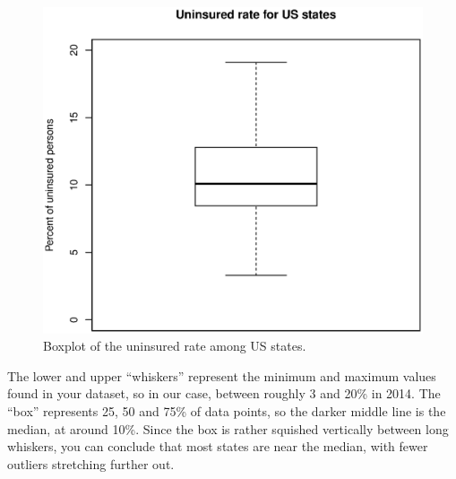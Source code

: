 \documentclass{report}
\begin{document}
	\begin{figure}[h]
		\centering
		\includegraphics[width=1.0\textwidth]{boxplot.eps}
		\caption{Boxplot of the uninsured rate among US states.}
		\label{fig:boxplot}
	\end{figure}

	The lower and upper ``whiskers'' represent the minimum and maximum values found in your dataset, so in our case, between roughly 3 and 20\% in 2014. The ``box'' represents 25, 50 and 75\% of data points, so the darker middle line is the median, at around 10\%. Since the box is rather squished vertically between long whiskers, you can conclude that most states are near the median, with fewer outliers stretching further out.
	
\end{document}
